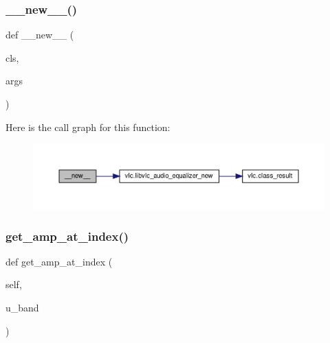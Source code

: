 \subsubsection{\texorpdfstring{\+\_\+\+\_\+new\+\_\+\+\_\+()}{\_\_new\_\_()}}
{\footnotesize\ttfamily def \+\_\+\+\_\+new\+\_\+\+\_\+ (\begin{DoxyParamCaption}\item[{}]{cls,  }\item[{}]{args }\end{DoxyParamCaption})}

Here is the call graph for this function\+:
\nopagebreak
\begin{figure}[H]
\begin{center}
\leavevmode
\includegraphics[width=350pt]{classvlc_1_1_audio_equalizer_acc2aa3fac6a63e8bac4f19efc327102b_cgraph}
\end{center}
\end{figure}
\mbox{\label{classvlc_1_1_audio_equalizer_a6e57bd49d3e905307ae97d8f1398b72f}} 
\subsubsection{\texorpdfstring{get\+\_\+amp\+\_\+at\+\_\+index()}{get\_amp\_at\_index()}}
{\footnotesize\ttfamily def get\+\_\+amp\+\_\+at\+\_\+index (\begin{DoxyParamCaption}\item[{}]{self,  }\item[{}]{u\+\_\+band }\end{DoxyParamCaption})}

